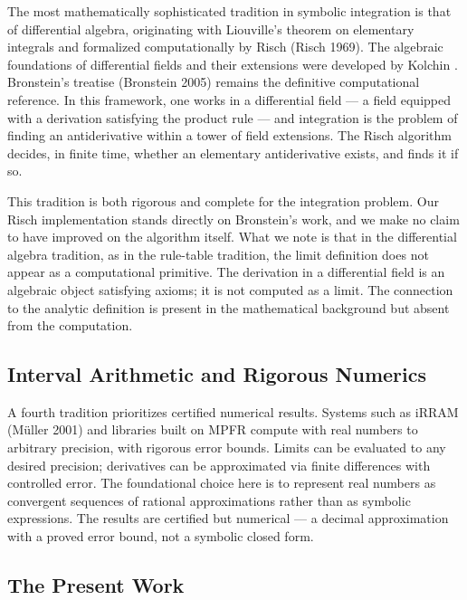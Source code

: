 \documentclass[12pt]{article}
\begin{document}
The most mathematically sophisticated tradition in symbolic integration
is that of differential algebra, originating with Liouville's theorem on
elementary integrals and formalized computationally by Risch (Risch
1969). The algebraic foundations of differential fields and their
extensions were developed by Kolchin \cite{kolchin1973}. Bronstein's
treatise (Bronstein 2005) remains the definitive computational reference. In this framework, one works in a differential field --- a
field equipped with a derivation satisfying the product rule --- and
integration is the problem of finding an antiderivative within a tower
of field extensions. The Risch algorithm decides, in finite time,
whether an elementary antiderivative exists, and finds it if so.

This tradition is both rigorous and complete for the integration
problem. Our Risch implementation stands directly on Bronstein's work,
and we make no claim to have improved on the algorithm itself. What we
note is that in the differential algebra tradition, as in the rule-table
tradition, the limit definition does not appear as a computational
primitive. The derivation in a differential field is an algebraic object
satisfying axioms; it is not computed as a limit. The connection to the
analytic definition is present in the mathematical background but absent
from the computation.


\subsection{Interval Arithmetic and Rigorous
Numerics}\label{interval-arithmetic-and-rigorous-numerics}

A fourth tradition prioritizes certified numerical results. Systems such
as iRRAM (Müller 2001) and libraries built on MPFR compute with real
numbers to arbitrary precision, with rigorous error bounds. Limits can
be evaluated to any desired precision; derivatives can be approximated
via finite differences with controlled error. The foundational choice
here is to represent real numbers as convergent sequences of rational
approximations rather than as symbolic expressions. The results are
certified but numerical --- a decimal approximation with a proved error
bound, not a symbolic closed form.


\subsection{The Present Work}\label{the-present-work}
\end{document}
